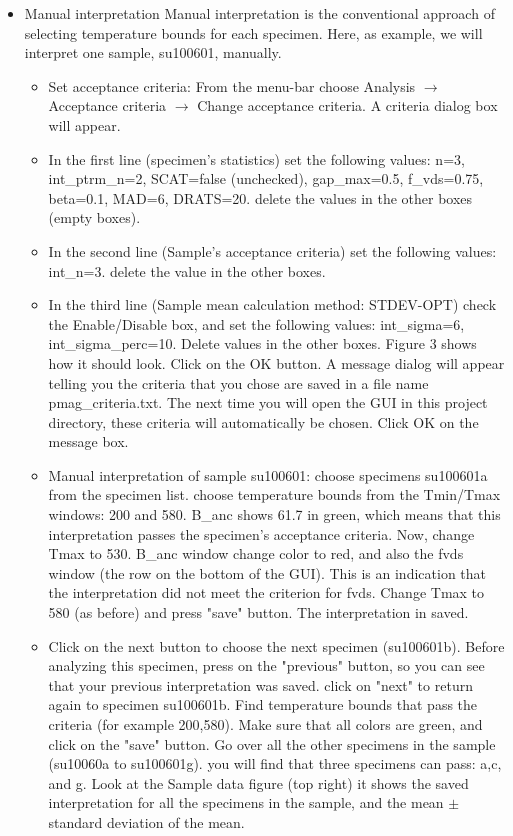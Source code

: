 \documentclass[11pt]{book}
\begin{document}
{{\begin{itemize}
\item{Manual interpretation}
Manual interpretation is the conventional approach of selecting temperature bounds for each specimen. Here, as example, we will interpret one sample, su100601,  manually.
\begin{itemize}
\item Set acceptance criteria: From the menu-bar choose  Analysis $\rightarrow$ Acceptance criteria $\rightarrow$ Change acceptance criteria. A criteria dialog box will appear.
\item In the first line (specimen's statistics) set the following values: n=3, int\_ptrm\_n=2, SCAT=false (unchecked), gap\_max=0.5, f\_vds=0.75, beta=0.1, MAD=6, DRATS=20. delete the values in the other boxes (empty boxes). 
\item In the second line (Sample's acceptance criteria) set the following values: int\_n=3. delete the value in the other boxes.
\item In the third line (Sample mean calculation method: STDEV-OPT) check the Enable/Disable box, and set the following values: int\_sigma=6, int\_sigma\_perc=10. Delete values in the other boxes. Figure 3 shows how it should look. Click on the OK button. A message dialog will appear telling you the criteria that you chose are saved in a file name pmag\_criteria.txt. The next time you will open the GUI in this project directory, these criteria will automatically be chosen. Click OK on the message box.
\item Manual interpretation of sample su100601: choose specimens su100601a from the specimen list. choose temperature bounds from the Tmin/Tmax windows: 200 and 580. B\_anc shows 61.7 in green, which means that this interpretation passes the specimen's acceptance criteria. Now, change Tmax to 530.  B\_anc window change color to red, and also the fvds window (the row on the bottom of the GUI). This is an indication that the interpretation did not meet the criterion for fvds. Change  Tmax to 580 (as before) and press "save" button. The interpretation in saved. 
\item Click on the next button to choose the next specimen (su100601b). Before analyzing this specimen, press on the "previous" button, so you can see that your previous interpretation was saved. click on "next" to return again to specimen su100601b. Find  temperature bounds that pass the criteria (for example 200,580). Make sure that all colors are green, and click on the "save" button. Go over all the other specimens in the sample (su10060a to su100601g). you will find that three specimens can pass: a,c, and g. Look at the Sample data figure (top right) it shows the saved interpretation for all the specimens in the sample, and the mean $\pm$  standard deviation of the mean. 

\end{itemize}
\end{itemize}}}
\end{document}
